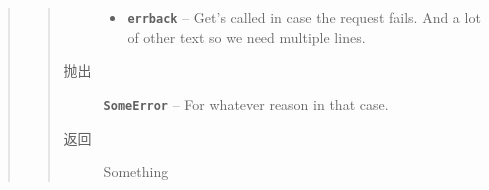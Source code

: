 \documentclass[letterpaper,10pt,english]{sphinxmanual}
\begin{document}
\begin{fulllineitems}
\begin{quote}
\begin{fulllineitems}
\begin{quote}
\begin{description}
\begin{itemize}
\item {} 
\textbf{\texttt{errback}} -- Get's called in case the request fails. And a lot of other
text so we need multiple lines.

\end{itemize}

\item[{抛出}] \leavevmode
\textbf{\texttt{SomeError}} -- For whatever reason in that case.

\item[{返回}] \leavevmode
Something

\end{description}\end{quote}

\end{fulllineitems}

\end{quote}

\end{fulllineitems}

\end{document}
